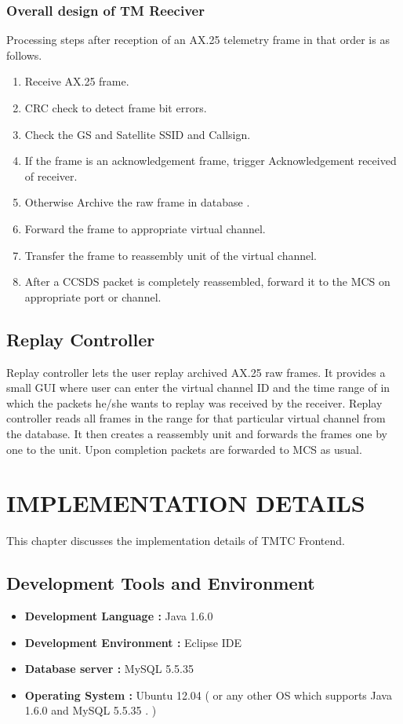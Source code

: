 \documentclass[BTech]{iitmdiss}
\begin{document}
\subsection{Overall design of TM Reeciver}
Processing steps after reception of an AX.25 telemetry frame in that order is as follows. 
\begin{enumerate}
\item Receive AX.25 frame.
\item CRC check to detect frame bit errors.
\item Check the GS and Satellite SSID and Callsign.
\item If the frame is an acknowledgement frame, trigger Acknowledgement received of receiver.
\item Otherwise Archive the raw frame in database .
\item Forward the frame to appropriate virtual channel.
\item Transfer the frame to reassembly unit of the virtual channel.
\item After a CCSDS packet is completely reassembled, forward it to the MCS on appropriate port or channel. 
\end{enumerate}

\section{Replay Controller}
Replay controller lets the user replay archived AX.25 raw frames. It provides a small GUI where user can enter the virtual channel ID and the time range of in which the packets he/she wants to replay was received by the receiver. Replay controller reads all frames in the range for that particular virtual channel from the database. It then creates a reassembly unit and forwards the frames one by one to the unit. Upon completion packets are forwarded to MCS as usual.

\chapter{IMPLEMENTATION DETAILS}
This chapter discusses the implementation details of TMTC Frontend.
\section{Development Tools and Environment }
\begin{itemize}
\item \textbf{Development Language : } Java 1.6.0
\item \textbf{Development Environment : } Eclipse IDE
\item \textbf{Database server : } MySQL 5.5.35
\item \textbf{Operating System : }Ubuntu 12.04 ( or any other OS which supports Java 1.6.0 and MySQL 5.5.35 . )
\end{itemize} 
\end{document}
